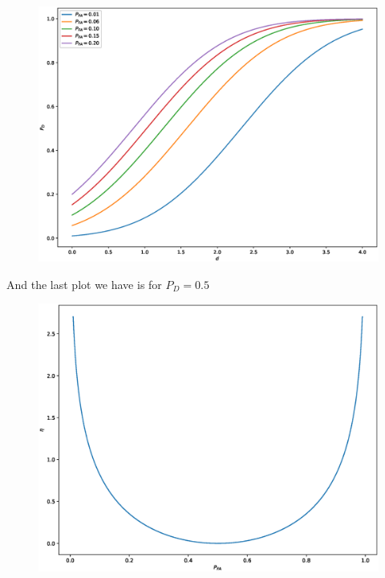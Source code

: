 \documentclass[a4paper]{article}
\begin{document}
\begin{figure}[H]
\begin{center}
  \includegraphics[scale=0.5]{hw5-1-2.eps}
\end{center}
\end{figure}

And the last plot we have is for $P_D = 0.5$

\begin{figure}[H]
\begin{center}
  \includegraphics[scale=0.5]{hw5-1-3.eps}
\end{center}
\end{figure}
\end{document}
